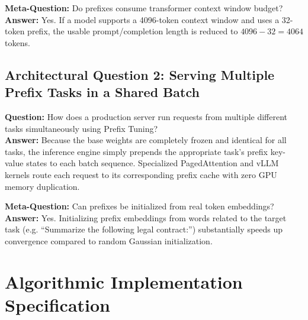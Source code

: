 \documentclass[11pt,a4paper]{article}
\theoremstyle{definition}
\begin{document}
\textbf{Meta-Question:} Do prefixes consume transformer context window budget?\\
\textbf{Answer:} Yes. If a model supports a 4096-token context window and uses a 32-token prefix, the usable prompt/completion length is reduced to $4096 - 32 = 4064$ tokens.

\subsection{Architectural Question 2: Serving Multiple Prefix Tasks in a Shared Batch}
\textbf{Question:} How does a production server run requests from multiple different tasks simultaneously using Prefix Tuning?\\
\textbf{Answer:} Because the base weights are completely frozen and identical for all tasks, the inference engine simply prepends the appropriate task's prefix key-value states to each batch sequence. Specialized PagedAttention and vLLM kernels route each request to its corresponding prefix cache with zero GPU memory duplication.

\textbf{Meta-Question:} Can prefixes be initialized from real token embeddings?\\
\textbf{Answer:} Yes. Initializing prefix embeddings from words related to the target task (e.g. ``Summarize the following legal contract:'') substantially speeds up convergence compared to random Gaussian initialization.

\section{Algorithmic Implementation Specification}
\end{document}
